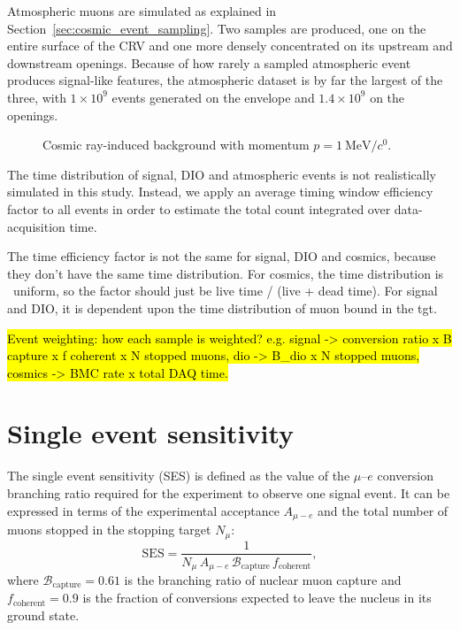 Atmospheric muons are simulated as explained in
Section~\ref{sec:cosmic_event_sampling}. Two samples are produced, one on the
entire surface of the CRV and one more densely concentrated on its upstream
and downstream openings. Because of how rarely a sampled atmospheric event
produces signal-like features, the atmospheric dataset is by far the largest of
the three, with $1 \times 10^9$ events generated on the envelope and $1.4 \times
10^9$ on the openings.



\begin{figure}
    \centering
    
    \caption{Cosmic ray-induced background with momentum $p=\SI{1}{\MeV/\clight}$.}
    \label{fig:cosmic_bg_in_cydet}
\end{figure}

The time distribution of signal, DIO and atmospheric events is not realistically
simulated in this study. Instead, we apply an average timing window efficiency
factor to all events in order to estimate the total count integrated over
data-acquisition time.

The time efficiency factor is not the same for signal, DIO and cosmics,
because they don't have the same time distribution. For cosmics, the time
distribution is ~uniform, so the factor should just be live time / (live +
dead time). For signal and DIO, it is dependent upon the time distribution of
muon bound in the tgt.


\hl{ Event weighting: how each sample is weighted? e.g. signal -> conversion
    ratio x B capture x f coherent x N stopped muons, dio -> B_dio x
    N stopped muons, cosmics -> BMC rate x total DAQ time.}

\section{Single event sensitivity}
The single event sensitivity (SES) is defined as the value of the $\mu$--$e$
conversion branching ratio required for the experiment to observe one signal
event. It can be expressed in terms of the experimental acceptance $A_{\mu-e}$ and the
total number of muons stopped in the stopping target $N_\mu$:
\begin{equation}
    \mathrm{SES} = \frac{1}{N_\mu\,A_{\mu-e}\,\mathcal{B}_\mathrm{capture}\,f_\mathrm{coherent}},
\end{equation}
where $\mathcal{B}_\mathrm{capture} = 0.61$ is the branching ratio of nuclear
muon capture and $f_\mathrm{coherent} = 0.9$ is the fraction of conversions
expected to leave the nucleus in its ground state.

